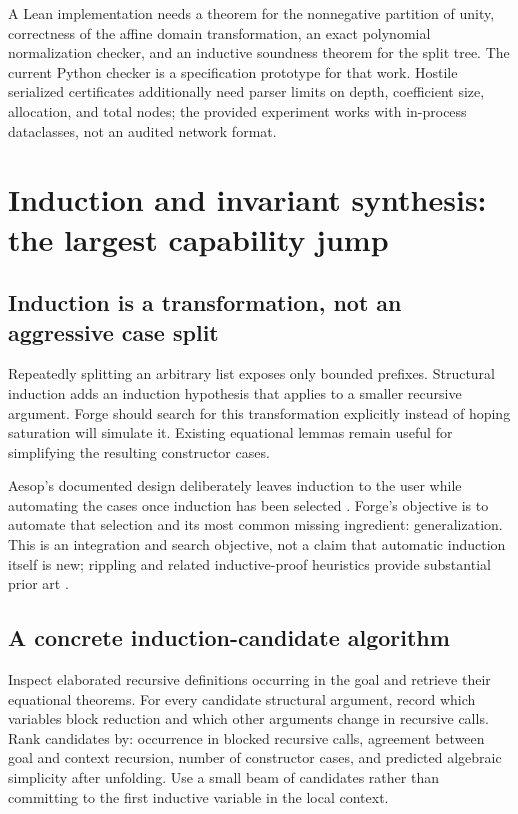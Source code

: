 \documentclass[11pt,a4paper]{article}
\begin{document}
A Lean implementation needs a theorem for the nonnegative partition of unity, correctness of the affine domain transformation, an exact polynomial normalization checker, and an inductive soundness theorem for the split tree. The current Python checker is a specification prototype for that work. Hostile serialized certificates additionally need parser limits on depth, coefficient size, allocation, and total nodes; the provided experiment works with in-process dataclasses, not an audited network format.

\section{Induction and invariant synthesis: the largest capability jump}
\subsection{Induction is a transformation, not an aggressive case split}
Repeatedly splitting an arbitrary list exposes only bounded prefixes. Structural induction adds an induction hypothesis that applies to a smaller recursive argument. Forge should search for this transformation explicitly instead of hoping saturation will simulate it. Existing equational lemmas remain useful for simplifying the resulting constructor cases.

Aesop's documented design deliberately leaves induction to the user while automating the cases once induction has been selected \cite{aesop}. Forge's objective is to automate that selection and its most common missing ingredient: generalization. This is an integration and search objective, not a claim that automatic induction itself is new; rippling and related inductive-proof heuristics provide substantial prior art \cite{rippling}.

\subsection{A concrete induction-candidate algorithm}
Inspect elaborated recursive definitions occurring in the goal and retrieve their equational theorems. For every candidate structural argument, record which variables block reduction and which other arguments change in recursive calls. Rank candidates by: occurrence in blocked recursive calls, agreement between goal and context recursion, number of constructor cases, and predicted algebraic simplicity after unfolding. Use a small beam of candidates rather than committing to the first inductive variable in the local context.
\end{document}
